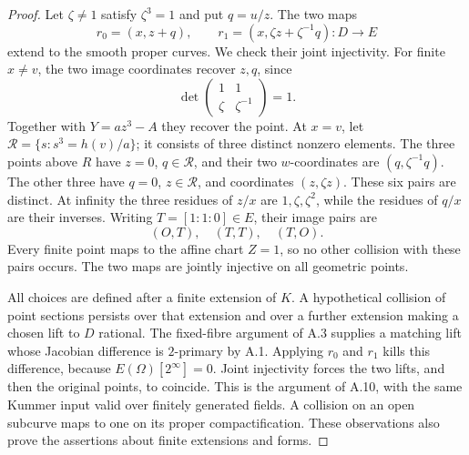 \begin{proof}
Let $\zeta\ne1$ satisfy $\zeta^3=1$ and put $q=u/z$. The two maps
\[
 r_0=(x,z+q),\qquad r_1=(x,\zeta z+\zeta^{-1}q):D\to E
\]
extend to the smooth proper curves. We check their joint injectivity.
For finite $x\ne v$, the two image coordinates recover $z,q$, since
\[
 \det\begin{pmatrix}1&1\\ \zeta&\zeta^{-1}\end{pmatrix}=1.
\]
Together with $Y=a z^3-A$ they recover the point. At $x=v$, let
$\mathcal R=\{s:s^3=h(v)/a\}$; it consists of three distinct
nonzero elements. The three points above $R$ have $z=0$, $q\in
\mathcal R$, and their two $w$-coordinates are
$(q,\zeta^{-1}q)$. The other three have $q=0$, $z\in\mathcal R$,
and coordinates $(z,\zeta z)$. These six pairs are distinct.
At infinity the three residues of $z/x$ are $1,\zeta,\zeta^2$,
while the residues of $q/x$ are their inverses. Writing
$T=[1:1:0]\in E$, their image pairs are
\[
                         (O,T),\quad(T,T),\quad(T,O).
\]
Every finite point maps to the affine chart $Z=1$, so no other
collision with these pairs occurs. The two maps are jointly injective
on all geometric points.

All choices are defined after a finite extension of $K$. A hypothetical
collision of point sections persists over that extension and over a
further extension making a chosen lift to $D$ rational. The fixed-fibre
argument of A.3 supplies a matching lift whose Jacobian difference is
$2$-primary by A.1. Applying $r_0$ and $r_1$ kills this difference,
because $E(\Omega)[2^\infty]=0$. Joint injectivity forces the two
lifts, and then the original points, to coincide. This is the argument
of A.10, with the same Kummer input valid over finitely generated
fields. A collision on an open subcurve maps to one on its proper
compactification. These observations also prove the assertions about
finite extensions and forms.
\end{proof}

